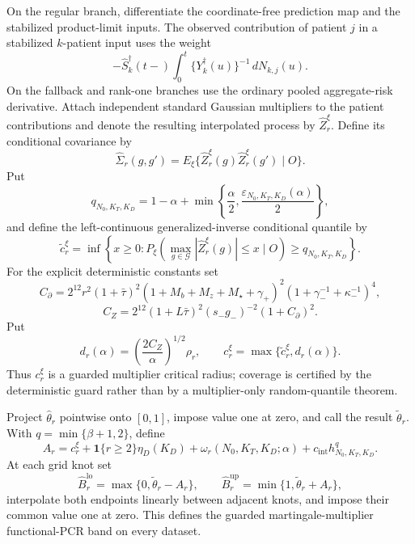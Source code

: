 On the regular branch, differentiate the coordinate-free prediction map and the stabilized product-limit inputs. The observed contribution of patient \(j\) in a stabilized \(k\)-patient input uses the weight
\[
 -\widehat S_k^\dagger(t-)
 \int_0^t\{Y_k^\dagger(u)\}^{-1}\,dN_{k,j}(u).
\]
On the fallback and rank-one branches use the ordinary pooled aggregate-risk derivative. Attach independent standard Gaussian multipliers to the patient contributions and denote the resulting interpolated process by \(\widehat Z_r^\xi\). Define its conditional covariance by
\[
 \widehat\Sigma_r(g,g')
 =E_\xi\{\widehat Z_r^\xi(g)\widehat Z_r^\xi(g')\mid O\}.
\]
Put
\[
 q_{N_0,K_T,K_D}=1-\alpha+
 \min\left\{\frac\alpha2,
 \frac{\varepsilon_{N_0,K_T,K_D}(\alpha)}2\right\},
\]
and define the left-continuous generalized-inverse conditional quantile by
\[
 \widetilde c_r^\xi=
 \inf\left\{x\ge0:
 P_\xi\left(\max_{g\in\mathcal G}|\widehat Z_r^\xi(g)|\le x
 \mid O\right)\ge q_{N_0,K_T,K_D}\right\}.
\]
For the explicit deterministic constants set
\[
 C_\partial=2^{12}r^2(1+\bar\tau)^2
 (1+M_b+M_z+M_\star+\gamma_+)^2
 (1+\gamma_-^{-1}+\kappa_-^{-1})^4,
\]
\[
 C_Z=2^{12}(1+L\bar\tau)^2(s_-g_-)^{-2}(1+C_\partial)^2.
\]
Put
\[
 d_r(\alpha)=\left(\frac{2C_Z}{\alpha}\right)^{1/2}\rho_r,
 \qquad c_r^\xi=\max\{\widetilde c_r^\xi,d_r(\alpha)\}.
\]
Thus \(c_r^\xi\) is a guarded multiplier critical radius; coverage is certified by the deterministic guard rather than by a multiplier-only random-quantile theorem.

Project \(\widehat\theta_r\) pointwise onto \([0,1]\), impose value one at zero, and call the result \(\widetilde\theta_r\). With \(q=\min\{\beta+1,2\}\), define
\[
 A_r=c_r^\xi+\mathbf1\{r\ge2\}\eta_D(K_D)
 +\omega_r(N_0,K_T,K_D;\alpha)
 +c_{\mathrm{int}}h_{N_0,K_T,K_D}^{q}.
\]
At each grid knot set
\[
 \widehat B_r^{\mathrm{lo}}=
 \max\{0,\widetilde\theta_r-A_r\},\qquad
 \widehat B_r^{\mathrm{up}}=
 \min\{1,\widetilde\theta_r+A_r\},
\]
interpolate both endpoints linearly between adjacent knots, and impose their common value one at zero. This defines the guarded martingale-multiplier functional-PCR band on every dataset.